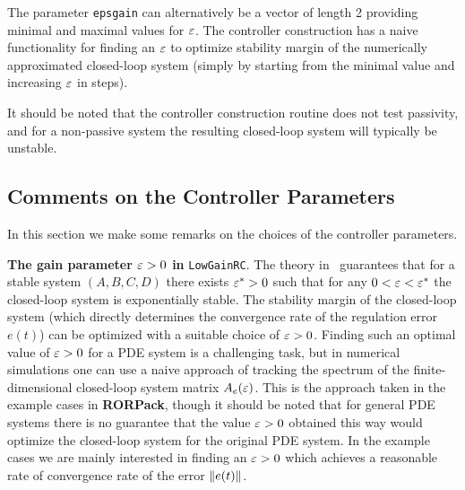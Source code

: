 \documentclass[11pt, a4paper]{amsart}
\newcommand{\COMMapproxRC}[1]{{\color{gray}#1}}
\renewcommand{\COMMapproxRC}[1]{}
\theoremstyle{definition}
\numberwithin{equation}{section}
\newcommand{\RORname}{\textbf{RORPack}}
\begin{document}
\begin{itemize}
The parameter \texttt{epsgain} can alternatively be a vector of length 2 providing minimal and maximal values for $\varepsilon$. The controller construction has a naive functionality for finding an $\varepsilon$ to optimize stability margin of the numerically approximated closed-loop system (simply by starting from the minimal value and increasing $\varepsilon$ in steps). 

It should be noted that the controller construction routine does not test passivity, and for a non-passive system the resulting closed-loop system will typically be unstable.

	\bigskip

     \COMMapproxRC{
     \item An ``approximate robust controller'' based on the reference~\cite{HumKur18} for finite-dimensional approximate control design for systems with infinite-dimensional output spaces.\\[1ex]
	 Calling sequence for the construction:\\[-1ex]
	   \begin{quotation}
	     \texttt{ApproximateRC(\dots)}
	   \end{quotation}
	 }
\end{itemize}

\subsection{Comments on the Controller Parameters}

In this section we make some remarks on the choices of the controller parameters.

\textbf{The gain parameter $\varepsilon>0$ in }\texttt{LowGainRC}. 
The theory in~\cite{HamPoh00,RebWei03} guarantees that for a stable system $(A,B,C,D)$ there exists $\varepsilon^\ast>0$ such that for any $0<\varepsilon<\varepsilon^\ast$ the closed-loop system is exponentially stable. The stability margin of the closed-loop system (which directly determines the convergence rate of the regulation error $e(t)$) can be optimized with a suitable choice of $\varepsilon>0$. Finding such an optimal value of $\varepsilon>0$ for a PDE system is a challenging task, but in numerical simulations one can use a naive approach of tracking the spectrum of the finite-dimensional closed-loop system matrix $A_e(\varepsilon)$. This is the approach taken in the example cases in \RORname, though it should be noted that for general PDE systems there is no guarantee that the value $\varepsilon>0$ obtained this way would optimize the closed-loop system for the original PDE system. 
In the example cases we are mainly interested in finding an $\varepsilon>0$ which achieves a reasonable rate of convergence rate of the error $\lVert e(t)\rVert$.
\end{document}

